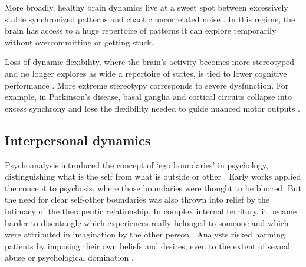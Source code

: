 \documentclass[11pt]{article}
\begin{document}
More broadly, healthy brain dynamics live at a sweet spot between excessively stable synchronized patterns and chaotic uncorrelated noise \citep{beggs2003neuronal, chialvo2010emergent, tognoli2014metastable, deco2011emerging, bak1987self, shew2011information, rabinovich2008transient, haldeman2005critical, kotler2025pathfinding}. In this regime, the brain has access to a huge repertoire of patterns it can explore temporarily without overcommitting or getting stuck. 

Loss of dynamic flexibility, where the brain's activity becomes more stereotyped and no longer explores as wide a repertoire of states, is tied to lower cognitive performance \citep{garrett2013bold, grady2014understanding, cocchi2017criticality, muller2025critical, shew2009neuronal}. More extreme stereotypy corresponds to severe dysfunction. For example, in Parkinson's disease, basal ganglia and cortical circuits collapse into excess synchrony and lose the flexibility needed to guide nuanced motor outputs \citep{hammond2007pathological, brown2003rhythmic}. 


\subsection{Interpersonal dynamics}



Psychoanalysis introduced the concept of `ego boundaries' in psychology, distinguishing what is the self from what is outside or other \citep{federn1928narcissism, tausk1919entstehung}. Early works applied the concept to psychosis, where those boundaries were thought to be blurred. But the need for clear self-other boundaries was also thrown into relief by the intimacy of the therapeutic relationship. In complex internal territory, it became harder to disentangle which experiences really belonged to someone and which were attributed in imagination by the other person \citep{freud1910future, heimann1950countertransference, gelso2007countertransference}. Analysts risked harming patients by imposing their own beliefs and desires, even to the extent of sexual abuse or psychological domination \citep{gabbard1995boundaries}. 
\end{document}
